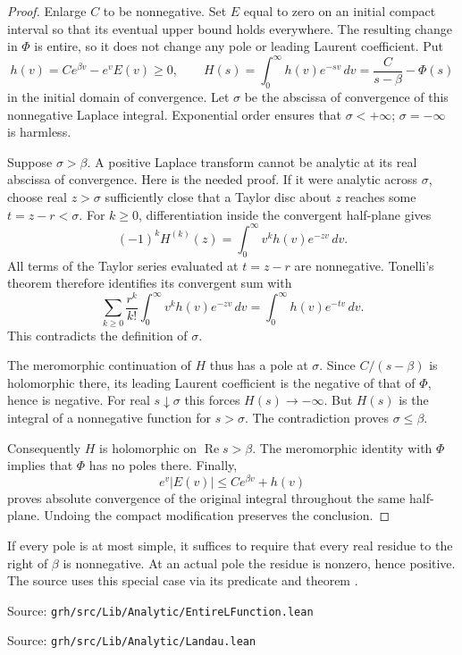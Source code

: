 \documentclass[11pt,letterpaper]{article}
\theoremstyle{definition}
\theoremstyle{remark}
\newcommand{\Rea}{\operatorname{Re}}
\newcommand{\code}[1]{\texttt{\small\detokenize{#1}}}
\newcommand{\src}[1]{\par{\small\color{navy}Source: \nolinkurl{grh/src/#1}}\par}
\begin{document}
\begin{proof}
Enlarge \(C\) to be nonnegative. Set \(E\) equal to zero on an initial
compact interval so that its eventual upper bound holds everywhere.
The resulting change in \(\Phi\) is entire, so it does not change any
pole or leading Laurent coefficient. Put
\[
 h(v)=Ce^{\beta v}-e^vE(v)\ge0,\qquad
 H(s)=\int_0^\infty h(v)e^{-sv}\,dv
     =\frac C{s-\beta}-\Phi(s)
\]
in the initial domain of convergence. Let \(\sigma\) be the abscissa of
convergence of this nonnegative Laplace integral. Exponential order
ensures that \(\sigma<+\infty\); \(\sigma=-\infty\) is harmless.

Suppose \(\sigma>\beta\). A positive Laplace transform cannot be analytic
at its real abscissa of convergence. Here is the needed proof. If it
were analytic across \(\sigma\), choose real \(z>\sigma\) sufficiently
close that a Taylor disc about \(z\) reaches some \(t=z-r<\sigma\).
For \(k\ge0\), differentiation inside the convergent half-plane gives
\[
 (-1)^k H^{(k)}(z)=\int_0^\infty v^k h(v)e^{-zv}\,dv.
\]
All terms of the Taylor series evaluated at \(t=z-r\) are nonnegative.
Tonelli's theorem therefore identifies its convergent sum with
\[
 \sum_{k\ge0}\frac{r^k}{k!}
       \int_0^\infty v^k h(v)e^{-zv}\,dv
 =\int_0^\infty h(v)e^{-tv}\,dv.
\]
This contradicts the definition of \(\sigma\).

The meromorphic continuation of \(H\) thus has a pole at \(\sigma\).
Since \(C/(s-\beta)\) is holomorphic there, its leading Laurent
coefficient is the negative of that of \(\Phi\), hence is negative.
For real \(s\downarrow\sigma\) this forces \(H(s)\to-\infty\).
But \(H(s)\) is the integral of a nonnegative function for \(s>\sigma\).
The contradiction proves \(\sigma\le\beta\).

Consequently \(H\) is holomorphic on \(\Rea s>\beta\).
The meromorphic identity with \(\Phi\) implies that \(\Phi\) has no
poles there. Finally,
\[
 e^v|E(v)|\le Ce^{\beta v}+h(v)
\]
proves absolute convergence of the original integral throughout the
same half-plane. Undoing the compact modification preserves the conclusion.
\end{proof}

If every pole is at most simple, it suffices to require that every real
residue to the right of \(\beta\) is nonnegative. At an actual pole
the residue is nonzero, hence positive. The source uses this special
case via its predicate \code{IsPolar} and theorem \code{IsPolar.landau}.
\src{Lib/Analytic/EntireLFunction.lean}
\src{Lib/Analytic/Landau.lean}
\end{document}
